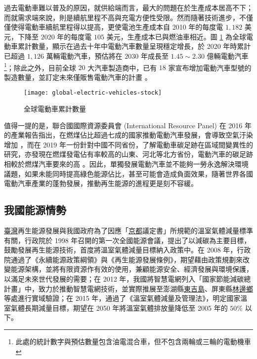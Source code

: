 過去電動車難以普及的原因，就供給端而言，最大的問題在於生產成本居高不下；而就需求端來說，則是續航里程不高與充電方便性受限。然而隨著技術進步，不僅僅使得電動車續航里程得以提高，更使電池生產成本自 2010 年的每度電 $1,182$ 美元，下降至 $2020$ 年的每度電 $105$ 美元，生產成本已與燃油車相近。圖 \ref{figure: Global Electric Vehicles Stock} 為全球電動車累計數量，顯示在過去十年中電動汽車數量呈現穩定增長，於 2020 年時累計已超過 $1,126$ 萬輛電動汽車，預估將在 $2030$ 年成長至 $1.45 \sim 2.30$ 億輛電動汽車\footnote{此處的統計數字與預估數量包含油電混合車，但不包含兩輪或三輪的電動機車}；除此之外，目前全球 $20$ 大汽車製造商中，已有 $18$ 家宣布增加電動汽車型號的製造數量，並訂定未來僅販售電動汽車的計畫 \cite{iea2021ev}。

\begin{figure}[htbp]
  \centering
  \texttt{[image: global-electric-vehicles-stock]}
  \caption[全球電動車累計數量]{全球電動車累計數量 \cite{iea2021ev}}
  \label{figure: Global Electric Vehicles Stock}
\end{figure}

值得一提的是，聯合國國際資源委員會 (International Resource Panel) 在 2016 年的產業報告指出，在燃煤佔比超過七成的國家推動電動汽車發展，會導致空氣汙染增加 \cite{hertwich2016green}，而在 2019 年一份針對中國不同省份，了解電動車碳足跡在區域間變異性的研究，亦發現在燃煤發電佔有率較高的山東、河北等北方省份，電動汽車的碳足跡相較於燃煤汽車要來的高 \cite{wu2019assessing}。因此，單獨發展電動汽車並不能夠一勞永逸解決環境議題，如果未能同時提高綠色能源佔比，甚至可能會造成負面效果，隨著世界各國電動汽車產業的蓬勃發展，推動再生能源的進程更是刻不容緩。

\subsection{我國能源情勢}

\uline{臺灣}再生能源發展與我國政府為了因應「\uline{京都}議定書」所規範的溫室氣體減量標準有關，行政院於 1998 年召開的第一次全國能源會議，提出了以減碳為主要目標，鼓勵發展再生能源技術，首度將溫室氣體減量目標納入政策中。在 2008 年，行政院通過了《永續能源政策綱領》與《再生能源發展條例》，期望藉由政策規劃來改變能源架構，並將有限資源作有效的使用，兼顧能源安全、經濟發展與環境保護，以滿足未來世代發展的需要；在 2012  年，我國將智慧電網列入「國家節能減碳總計畫」中，致力於推動智慧電網技術，並實際推展至澎湖縣\uline{東吉島}、屏東縣\uline{林邊鄉}等處進行實域驗證；在 2015 年，通過了《溫室氣體減量及管理法》，明定國家溫室氣體長期減量目標，期望在 2050 年將溫室氣體排放量降低至 2005 年的 $50\%$ 以下。

